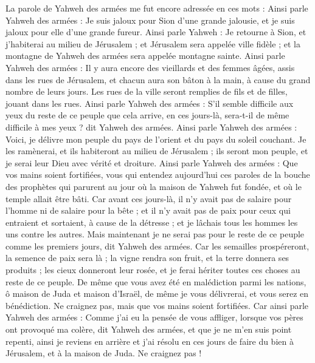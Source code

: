 \begin{multicols}{2}
\VerseOne{}La parole de Yahweh des armées me fut encore adressée en ces mots :
Ainsi parle Yahweh des armées : Je suis jaloux pour Sion d'une grande jalousie, et je suis jaloux pour elle d’une grande fureur.
Ainsi parle Yahweh : Je retourne à Sion, et j'habiterai au milieu de Jérusalem ; et Jérusalem sera appelée ville fidèle ; et la montagne de Yahweh des armées sera appelée montagne sainte.
Ainsi parle Yahweh des armées : Il y aura encore des vieillards et des femmes âgées, assis dans les rues de Jérusalem, et chacun aura son bâton à la main, à cause du grand nombre de leurs jours.
Les rues de la ville seront remplies de fils et de filles, jouant dans les rues.
Ainsi parle Yahweh des armées : S’il semble difficile aux yeux du reste de ce peuple que cela arrive, en ces jours-là, sera-t-il de même difficile à mes yeux ? dit Yahweh des armées.
Ainsi parle Yahweh des armées : Voici, je délivre mon peuple du pays de l'orient et du pays du soleil couchant.
Je les ramènerai, et ils habiteront au milieu de Jérusalem ; ils seront mon peuple, et je serai leur Dieu avec vérité et droiture.
Ainsi parle Yahweh des armées : Que vos mains soient fortifiées, vous qui entendez aujourd’hui ces paroles de la bouche des prophètes qui parurent au jour où la maison de Yahweh fut fondée, et où le temple allait être bâti.
Car avant ces jours-là, il n'y avait pas de salaire pour l'homme ni de salaire pour la bête ; et il n'y avait pas de paix pour ceux qui entraient et sortaient, à cause de la détresse ; et je lâchais tous les hommes les uns contre les autres.
Mais maintenant je ne serai pas pour le reste de ce peuple comme les premiers jours,  dit Yahweh des armées.
Car les semailles prospéreront, la semence de paix sera là ; la vigne rendra son fruit, et la terre donnera ses produits ; les cieux donneront leur rosée, et je ferai hériter toutes ces choses au reste de ce peuple.
De même que vous avez été en malédiction parmi les nations, ô maison de Juda et maison d'Israël, de même je vous délivrerai, et vous serez en bénédiction. Ne craignez pas, mais que vos mains soient fortifiées.
Car ainsi parle Yahweh des armées : Comme j'ai eu la pensée de vous affliger, lorsque vos pères ont provoqué ma colère, dit Yahweh des armées, et que je ne m'en suis point repenti,
ainsi je reviens en arrière et j’ai résolu en ces jours de faire du bien à Jérusalem, et à la maison de Juda. Ne craignez pas !

\end{multicols}
